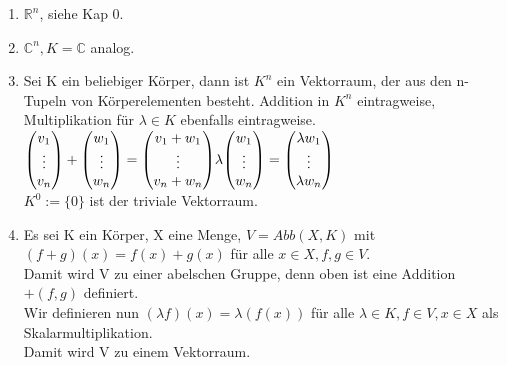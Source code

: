 \documentclass{article}
\newcommand{\lb}{\lambda}
\newcommand{\C}{\mathbb{C}}
\newcommand{\mRn}{$\mathbb{R}^n$}
\newcommand{\ve}[1]{{\begin{pmatrix}#1 \end{pmatrix}}}
\renewcommand{\v}{\ve}
\begin{document}
\begin{enumerate}
\item{\mRn, siehe Kap 0.}
\item{$\C^n, K = \C$ analog.}
\item{Sei K ein beliebiger Körper, dann ist $K^n$ ein Vektorraum, der aus den n-Tupeln von Körperelementen besteht. Addition in $K^n$ eintragweise, Multiplikation für $\lb \in K$ ebenfalls eintragweise.\\
$
\v{v_1\\ \vdots\\ v_n} + \v{w_1\\ \vdots\\ w_n} = \v{v_1 + w_1\\ \vdots \\ v_n + w_n}\\
\lb \v{w_1\\ \vdots\\ w_n} = \v{\lb w_1\\ \vdots \\ \lb w_n}
$\\
$K^0 := \{0\}$ ist der triviale Vektorraum.}
\item{Es sei K ein Körper, X eine Menge, $V = Abb(X, K)$ mit\\
$(f + g)(x) = f(x) + g(x)$ für alle $x \in X, f, g \in V$.\\
Damit wird V zu einer abelschen Gruppe, denn oben ist eine Addition $+(f, g)$ definiert.\\
Wir definieren nun $(\lb f)(x) = \lb (f(x))$ für alle $\lb \in K, f \in V, x \in X$ als Skalarmultiplikation.\\
Damit wird V zu einem Vektorraum.
}
\end{enumerate}
\end{document}
